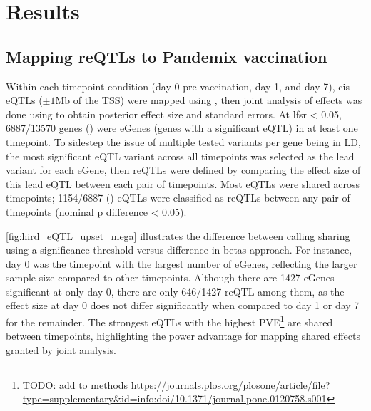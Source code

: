 \section{Results}

\subsection{Mapping reQTLs to Pandemix vaccination}

Within each timepoint condition (day 0 pre-vaccination, day 1, and day 7), cis-\glspl{eQTL} ($\pm 1 \text{Mb}$ of the \gls{TSS}) were mapped using ,
then joint analysis of effects was done using  to obtain posterior effect size and standard errors.
At \gls{lfsr} < 0.05, 6887/13570 genes () were eGenes (genes with a significant \gls{eQTL}) in at least one timepoint.
To sidestep the issue of multiple tested variants per gene being in \gls{LD},
the most significant \gls{eQTL} variant across all timepoints was selected as the lead variant for each eGene,
then \glspl{reQTL} were defined by comparing the effect size of this lead \gls{eQTL} between each pair of timepoints.
Most \glspl{eQTL} were shared across timepoints; 1154/6887 () \glspl{eQTL} were classified as \glspl{reQTL} between any pair of timepoints (nominal p difference < 0.05).

\autoref{fig:hird_eQTL_upset_mega} illustrates the difference between calling sharing using a significance threshold versus difference in betas approach.
For instance, day 0 was the timepoint with the largest number of eGenes, reflecting the larger sample size compared to other timepoints.
Although there are 1427 eGenes significant at only day 0, there are only 646/1427 reQTL among them, as the effect size at day 0 does not differ significantly when compared to day 1 or day 7 for the remainder.
The strongest \glspl{eQTL} with the highest \gls{PVE}\footnote{TODO: add to methods \url{https://journals.plos.org/plosone/article/file?type=supplementary&id=info:doi/10.1371/journal.pone.0120758.s001}}
are shared between timepoints, highlighting the power advantage for mapping shared effects granted by joint analysis.

